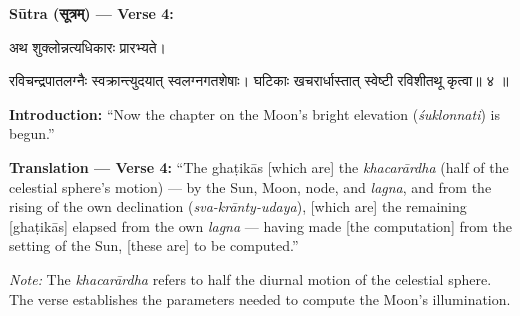 \documentclass[11pt,a4paper]{article}
\newcommand{\dev}[1]{{\devanagarifont #1}}
\newenvironment{sanskritverse}{%
  \begin{center}\begin{minipage}{0.95\textwidth}
  \setlength{\leftskip}{1em}
  \setlength{\rightskip}{1em}
  \dev
}{\end{minipage}\end{center}}
\newenvironment{paracol}[1]{\begingroup}{\endgroup}
\newcommand{\switchcolumn}[1][]{%
  \ifnum#1=0\relax\else\par\nobreak\vspace{0.5em}\par\nobreak\fi%
}
\begin{document}
\vspace{0.5em}
\noindent\textbf{Sūtra (\dev{सूत्रम्}) — Verse 4:}

\begin{paracol}{2}

\begin{sanskritverse}
अथ शुक्लोन्नत्यधिकारः प्रारभ्यते।
\end{sanskritverse}

\begin{sanskritverse}
रविचन्द्रपातलग्नैः स्वक्रान्त्युदयात् स्वलग्नगतशेषाः।
घटिकाः खचरार्धास्तात् स्वेष्टी रविशीतथू कृत्वा॥ ४ ॥
\end{sanskritverse}

\switchcolumn

\textbf{Introduction:} ``Now the chapter on the Moon's bright elevation (\textit{śuklonnati}) is begun.''

\textbf{Translation — Verse 4:} ``The ghaṭikās [which are] the \textit{khacarārdha} (half of the celestial sphere's motion) --- by the Sun, Moon, node, and \textit{lagna}, and from the rising of the own declination (\textit{sva-krānty-udaya}), [which are] the remaining [ghaṭikās] elapsed from the own \textit{lagna} --- having made [the computation] from the setting of the Sun, [these are] to be computed.''

\textit{Note:} The \textit{khacarārdha} refers to half the diurnal motion of the celestial sphere. The verse establishes the parameters needed to compute the Moon's illumination.

\end{paracol}

\vspace{0.5em}
\end{document}
